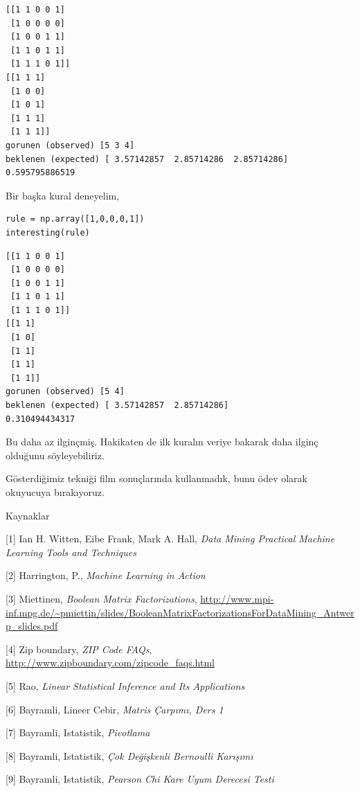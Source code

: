 \documentclass[12pt,fleqn]{article}\usepackage{../../common}
\begin{document}
\begin{verbatim}
[[1 1 0 0 1]
 [1 0 0 0 0]
 [1 0 0 1 1]
 [1 1 0 1 1]
 [1 1 1 0 1]]
[[1 1 1]
 [1 0 0]
 [1 0 1]
 [1 1 1]
 [1 1 1]]
gorunen (observed) [5 3 4]
beklenen (expected) [ 3.57142857  2.85714286  2.85714286]
0.595795886519
\end{verbatim}

Bir başka kural deneyelim, 

\begin{verbatim}
rule = np.array([1,0,0,0,1])
interesting(rule)
\end{verbatim}

\begin{verbatim}
[[1 1 0 0 1]
 [1 0 0 0 0]
 [1 0 0 1 1]
 [1 1 0 1 1]
 [1 1 1 0 1]]
[[1 1]
 [1 0]
 [1 1]
 [1 1]
 [1 1]]
gorunen (observed) [5 4]
beklenen (expected) [ 3.57142857  2.85714286]
0.310494434317
\end{verbatim}

Bu daha az ilginçmiş. Hakikaten de ilk kuralın veriye bakarak daha ilginç
olduğunu söyleyebiliriz. 

Gösterdiğimiz tekniği film sonuçlarında kullanmadık, bunu ödev olarak
okuyucuya bırakıyoruz.

Kaynaklar

[1] Ian H. Witten, Eibe Frank, Mark A. Hall, {\em Data Mining Practical Machine Learning Tools and Techniques}

[2] Harrington, P., {\em Machine Learning in Action}

[3] Miettinen, {\em Boolean Matrix Factorizations}, \url{http://www.mpi-inf.mpg.de/~pmiettin/slides/BooleanMatrixFactorizationsForDataMining_Antwerp_slides.pdf}

[4] Zip boundary, {\em ZIP Code FAQs}, \url{http://www.zipboundary.com/zipcode_faqs.html}

[5] Rao, {\em Linear Statistical Inference and Its Applications}

[6] Bayramli, Lineer Cebir, {\em Matris Çarpımı, Ders 1}

[7] Bayramli, Istatistik, {\em Pivotlama}

[8] Bayramli, Istatistik, {\em Çok Değişkenli Bernoulli Karışımı}

[9] Bayramli, Istatistik, {\em Pearson Chi Kare Uyum Derecesi Testi}
\end{document}
